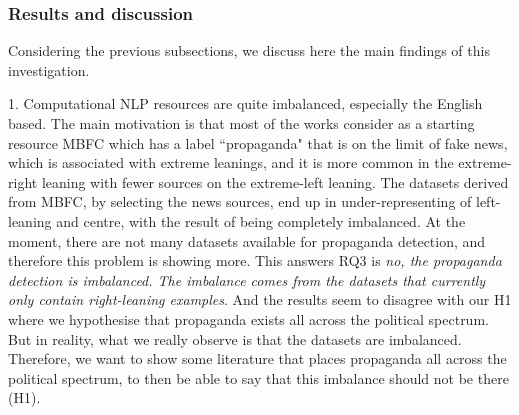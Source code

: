 \subsubsection{Results and discussion}
\label{ssec:ps_prop_leaning_imbalanced_discussion}

Considering the previous subsections, we discuss here the main findings of this investigation.




1. Computational NLP resources are quite imbalanced, especially the English based. The main motivation is that most of the works consider as a starting resource MBFC which has a label ``propaganda" that is on the limit of fake news, which is associated with extreme leanings, and it is more common in the extreme-right leaning with fewer sources on the extreme-left leaning. The datasets derived from MBFC, by selecting the news sources, end up in under-representing of left-leaning and centre, with the result of being completely imbalanced.
At the moment, there are not many datasets available for propaganda detection, and therefore this problem is showing more.
This answers RQ3 is \emph{no, the propaganda detection is imbalanced. The imbalance comes from the datasets that currently only contain right-leaning examples}.
And the results seem to disagree with our H1 where we hypothesise that propaganda exists all across the political spectrum.
But in reality, what we really observe is that the datasets are imbalanced. Therefore, we want to show some literature that places propaganda all across the political spectrum, to then be able to say that this imbalance should not be there (H1).


